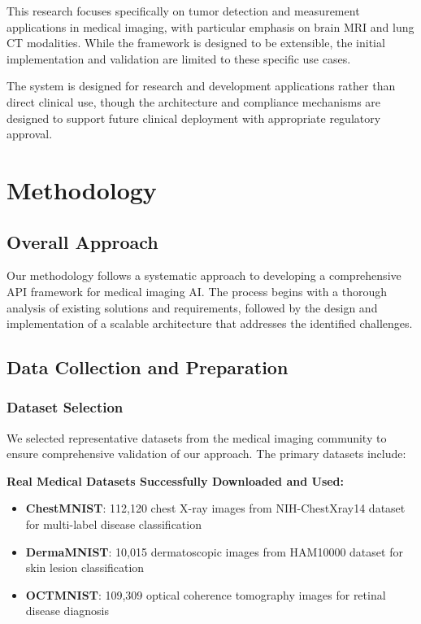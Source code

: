 \documentclass[12pt,a4paper]{article}
\begin{document}
This research focuses specifically on tumor detection and measurement applications in medical imaging, with particular emphasis on brain MRI and lung CT modalities. While the framework is designed to be extensible, the initial implementation and validation are limited to these specific use cases.

The system is designed for research and development applications rather than direct clinical use, though the architecture and compliance mechanisms are designed to support future clinical deployment with appropriate regulatory approval.

\section{Methodology}

\subsection{Overall Approach}

Our methodology follows a systematic approach to developing a comprehensive API framework for medical imaging AI. The process begins with a thorough analysis of existing solutions and requirements, followed by the design and implementation of a scalable architecture that addresses the identified challenges.

\subsection{Data Collection and Preparation}

\subsubsection{Dataset Selection}

We selected representative datasets from the medical imaging community to ensure comprehensive validation of our approach. The primary datasets include:

\textbf{Real Medical Datasets Successfully Downloaded and Used:}
\begin{itemize}
    \item \textbf{ChestMNIST}: 112,120 chest X-ray images from NIH-ChestXray14 dataset for multi-label disease classification \cite{wang2017chestxray8}
    \item \textbf{DermaMNIST}: 10,015 dermatoscopic images from HAM10000 dataset for skin lesion classification \cite{tschandl2018ham10000}
    \item \textbf{OCTMNIST}: 109,309 optical coherence tomography images for retinal disease diagnosis \cite{kermany2018identifying}
\end{itemize}
\end{document}
